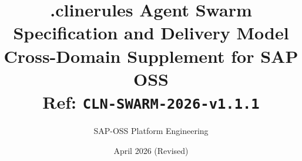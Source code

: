 \documentclass[11pt,a4paper,twoside]{report}
\begin{document}
\title{\vspace{-2em}\Large .clinerules Agent Swarm \\
       \textbf{Specification and Delivery Model} \\
       \large Cross-Domain Supplement for SAP OSS \\
       \small Ref: \texttt{CLN-SWARM-2026-v1.1.1}}
\author{SAP-OSS Platform Engineering}
\date{April 2026 (Revised)}

\maketitle











\end{document}
